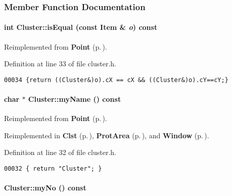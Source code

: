 \subsubsection{Member Function Documentation}
\label{Cluster_a5}
\paragraph{\setlength{\rightskip}{0pt plus 5cm}int Cluster::is\-Equal (const {\bf Item} \& {\em o}) const\hspace{0.3cm}{\tt  [inline, virtual]}}\hfill



Reimplemented from {\bf Point} {\rm (p.\,\pageref{Point_a7})}.

Definition at line 33 of file cluster.h.\small\begin{verbatim}00034 {return ((Cluster&)o).cX == cX && ((Cluster&)o).cY==cY;}
\end{verbatim}\normalsize 
\label{Cluster_a4}
\paragraph{\setlength{\rightskip}{0pt plus 5cm}char $\ast$ Cluster::my\-Name () const\hspace{0.3cm}{\tt  [inline, virtual]}}\hfill



Reimplemented from {\bf Point} {\rm (p.\,\pageref{Point_a5})}.

Reimplemented in {\bf Clst} {\rm (p.\,\pageref{Clst_a4})}, {\bf Prot\-Area} {\rm (p.\,\pageref{ProtArea_a3})}, and {\bf Window} {\rm (p.\,\pageref{Window_a3})}.

Definition at line 32 of file cluster.h.\small\begin{verbatim}00032 { return "Cluster"; }
\end{verbatim}\normalsize 
\label{Cluster_a3}
\paragraph{ Cluster::my\-No () const\hspace{0.3cm}{\tt  [inline, virtual]}}\hfill



